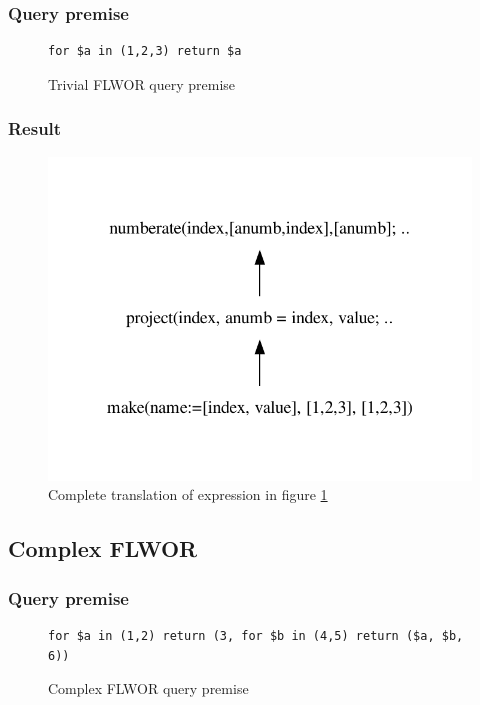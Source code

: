 \subsubsection{Query premise}
\begin{figure}[!htp]
\begin{center}
\begin{Verbatim}
for $a in (1,2,3) return $a
\end{Verbatim}
  \caption{Trivial FLWOR query premise}
  \label{fig:results:query_trivial_flwor}
\end{center}
\end{figure}

\subsubsection{Result}
\begin{figure}[!htp]
\begin{center}
  \includegraphics[width=1.0\textwidth]{img/graphs/td_impl_flwor_simple_xq_relalg} \caption{Complete translation of expression in figure
  \ref{fig:results:query_trivial_flwor}}
  \label{fig:results:query_trivial_flwor_result}
\end{center}
\end{figure}

\newpage

\subsection{Complex FLWOR}
\subsubsection{Query premise}
\begin{figure}[!htp]
\begin{center}
\begin{Verbatim}
for $a in (1,2) return (3, for $b in (4,5) return ($a, $b, 6))
\end{Verbatim}
  \caption{Complex FLWOR query premise}
  \label{fig:results:query_complex_flwor}
\end{center}
\end{figure}

